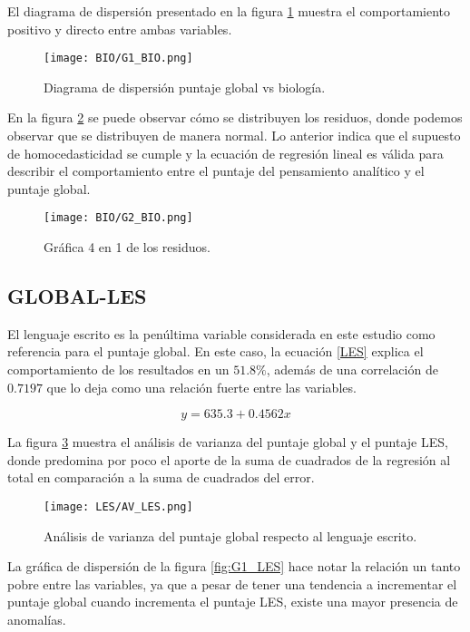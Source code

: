 \documentclass{article}
\begin{document}
El diagrama de dispersión presentado en la figura \ref{fig:G1_BIO} muestra el comportamiento positivo y directo entre ambas variables.

\begin{figure}[H]
    \centering
    \texttt{[image: BIO/G1\_BIO.png]}
    \caption{Diagrama de dispersión puntaje global vs biología.}
    \label{fig:G1_BIO}
\end{figure}

En la figura \ref{fig:G2_BIO} se puede observar cómo se distribuyen los residuos, donde podemos observar que se distribuyen de manera normal. Lo anterior indica que el supuesto de homocedasticidad se cumple y la ecuación de regresión lineal es válida para describir el comportamiento entre el puntaje del pensamiento analítico y el puntaje global.

\begin{figure}[H]
    \centering
    \texttt{[image: BIO/G2\_BIO.png]}
    \caption{Gráfica 4 en 1 de los residuos.}
    \label{fig:G2_BIO}
\end{figure}

\subsection{GLOBAL-LES}

El lenguaje escrito es la penúltima variable considerada en este estudio como referencia para el puntaje global. En este caso, la ecuación \ref{LES} explica el comportamiento de los resultados en un $51.8\%$, además de una correlación de $0.7197$ que lo deja como una relación fuerte entre las variables. 

\begin{equation}
    y = 635.3 + 0.4562x
    \label{LES}
\end{equation}

La figura \ref{fig:AV_LES} muestra el análisis de varianza del puntaje global y el puntaje LES, donde predomina por poco el aporte de la suma de cuadrados de la regresión al total en comparación a la suma de cuadrados del error.

\begin{figure}[H]
    \centering
    \texttt{[image: LES/AV\_LES.png]}
    \caption{Análisis de varianza del puntaje global respecto al lenguaje escrito.}
    \label{fig:AV_LES}
\end{figure}

La gráfica de dispersión de la figura \ref{fig:G1_LES} hace notar la relación un tanto pobre entre las variables, ya que a pesar de tener una tendencia a incrementar el puntaje global cuando incrementa el puntaje LES, existe una mayor presencia de anomalías.
\end{document}

